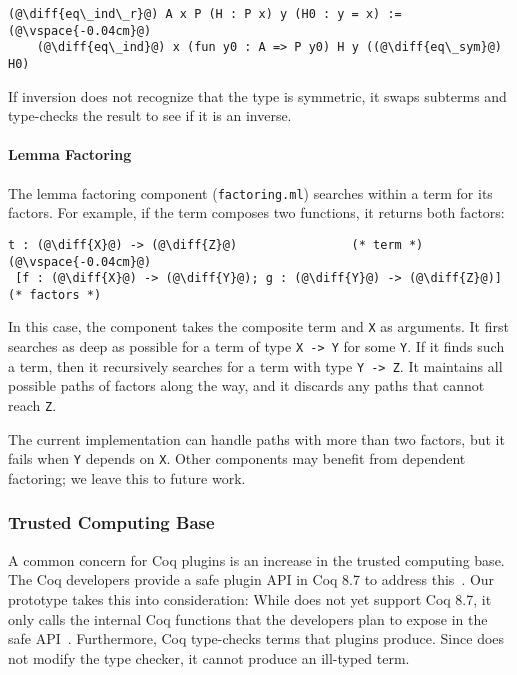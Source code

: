 \begin{lstlisting}[language=coq]
  (@\diff{eq\_ind\_r}@) A x P (H : P x) y (H0 : y = x) :=(@\vspace{-0.04cm}@)
    (@\diff{eq\_ind}@) x (fun y0 : A => P y0) H y ((@\diff{eq\_sym}@) H0)	
\end{lstlisting}
If inversion does not recognize that the type is symmetric, it
swaps subterms and type-checks the result to see if it is an inverse.

\paragraph{Lemma Factoring} The lemma factoring component (\lstinline{factoring.ml}) searches within a term
for its factors. For example,
if the term composes two functions, it returns both factors:

\begin{lstlisting}[language=coq]
  t : (@\diff{X}@) -> (@\diff{Z}@)                (* term *)(@\vspace{-0.04cm}@)
 [f : (@\diff{X}@) -> (@\diff{Y}@); g : (@\diff{Y}@) -> (@\diff{Z}@)] (* factors *)
\end{lstlisting}
In this case, the component takes the composite term and \lstinline{X} as arguments.
It first searches as deep as possible for a term of type \lstinline{X -> Y} for some \lstinline{Y}.
If it finds such a term, then it recursively searches for a term with type \lstinline{Y -> Z}. 
It maintains all possible 
paths of factors along the way, and it discards any paths that cannot reach \lstinline{Z}.

The current implementation can handle paths
with more than two factors, but it fails when \lstinline{Y} depends on \lstinline{X}.
Other components may benefit from dependent factoring; we leave this to future work.

\subsubsection{Trusted Computing Base}
\label{sec:tcb}

A common concern for Coq plugins is an increase in the trusted computing base.
The Coq developers provide a safe plugin API in Coq 8.7 to address this~\cite{coq87news}.
Our prototype takes this into consideration:
While \sysname does not yet support Coq 8.7, it only calls the internal Coq functions that the 
developers plan to expose in the safe API~\cite{coqPR}.
Furthermore, Coq type-checks terms that plugins produce.
Since \sysname does not modify the type checker, it cannot produce an ill-typed term.

